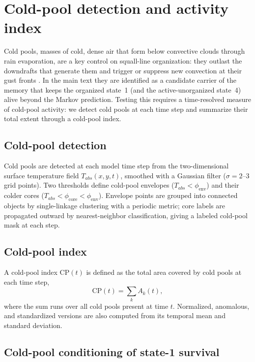 \documentclass[
    aps,
    prl,
    reprint,
    superscriptaddress,
    amsmath,amssymb,
    floatfix,
    nofootinbib
]{revtex4-2}
\begin{document}
\section*{Cold-pool detection and activity index}

Cold pools, masses of cold, dense air that form below convective clouds through rain evaporation, are a key control on squall-line organization: they outlast the downdrafts that generate them and trigger or suppress new convection at their gust fronts \cite{rotunno1988theory, houze1977structure, tompkins2001coldpools, abramian2022shear, torri2015mechanisms}. In the main text they are identified as a candidate carrier of the memory that keeps the organized state~1 (and the active-unorganized state~4) alive beyond the Markov prediction. Testing this requires a time-resolved measure of cold-pool activity: we detect cold pools at each time step and summarize their total extent through a cold-pool index.

\subsection*{Cold-pool detection}

Cold pools are detected at each model time step from the two-dimensional surface temperature field $T_{abs}(x,y,t)$, smoothed with a Gaussian filter ($\sigma = 2$--$3$ grid points). Two thresholds define cold-pool envelopes ($T_{abs}<\phi_{\mathrm{env}}$) and their colder cores ($T_{abs}<\phi_{\mathrm{core}}<\phi_{\mathrm{env}}$). Envelope points are grouped into connected objects by single-linkage clustering with a periodic metric; core labels are propagated outward by nearest-neighbor classification, giving a labeled cold-pool mask at each step.


\subsection*{Cold-pool index}

A cold-pool index $\mathrm{CP}(t)$ is defined as the total area covered by cold pools at each time step,
\begin{equation}
\mathrm{CP}(t) = \sum_k A_k(t),
\label{eq:cp_index}
\end{equation}
where the sum runs over all cold pools present at time $t$. Normalized, anomalous, and standardized versions are also computed from its temporal mean and standard deviation.


\subsection*{Cold-pool conditioning of state-1 survival}
\end{document}
